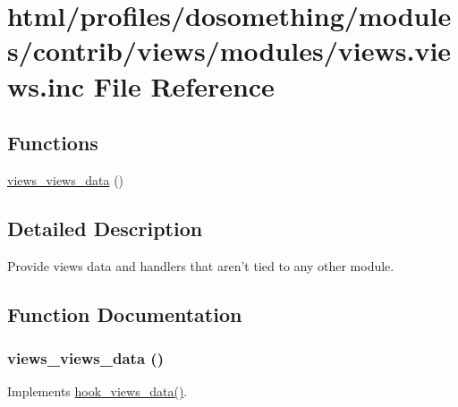 \hypertarget{views_8views_8inc}{
\section{html/profiles/dosomething/modules/contrib/views/modules/views.views.inc File Reference}
\label{views_8views_8inc}
}
\subsection*{Functions}
\begin{DoxyCompactItemize}
\item 
\hyperlink{views_8views_8inc_a7cb75f664d834d02d298626b158c2b75}{views\_\-views\_\-data} ()
\end{DoxyCompactItemize}


\subsection{Detailed Description}
Provide views data and handlers that aren't tied to any other module. 

\subsection{Function Documentation}
\hypertarget{views_8views_8inc_a7cb75f664d834d02d298626b158c2b75}{
\subsubsection[{views\_\-views\_\-data}]{\setlength{\rightskip}{0pt plus 5cm}views\_\-views\_\-data ()}}
\label{views_8views_8inc_a7cb75f664d834d02d298626b158c2b75}
Implements \hyperlink{group__views__hooks_ga227057901681e4a33e33c199c7a8c989}{hook\_\-views\_\-data()}. 
